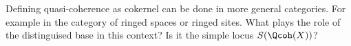 \begin{question}[O.Biesel]

Defining quasi-coherence as cokernel can be done in more general categories.
For example in the category of ringed spaces or ringed sites. What plays the role of the distinguised base in this context? 
Is it the simple locus $S(\Qcoh(X))$?

\end{question}